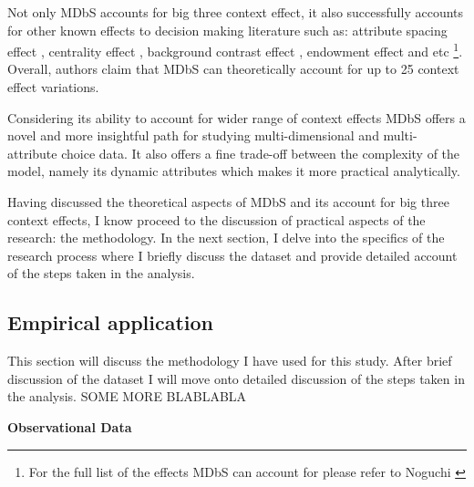 \documentclass[a4paper,12pt]{article}
\newcommand{\citeyearonly}[1]{\citeyearpar{#1}}
\begin{document}
Not only MDbS accounts for big three context effect, it also successfully accounts for other known effects to decision making literature such as: attribute spacing effect \citep{cooke1998multiattribute}, centrality effect \citep{brown2011decision}, background contrast effect \citep{tverskySimonson93}, endowment effect \citep{knetsch1989endowment} and etc \footnote{For the full list of the effects MDbS can account for please refer to Noguchi \citeyearonly{noguchi2018multialternative}}. Overall, authors claim that MDbS can theoretically account for up to 25 context effect variations. 

Considering its ability to account for wider range of context effects MDbS offers a novel and more insightful path for studying multi-dimensional and multi-attribute choice data. It also offers a fine trade-off between the complexity of the model, namely its dynamic attributes which makes it more practical analytically. 

Having discussed the theoretical aspects of MDbS and its account for big three context effects, I know proceed to the discussion of practical aspects of the research: the methodology. In the next section, I delve into the specifics of the research process where I briefly discuss the dataset and provide detailed account of the steps taken in the analysis.

\subsection{Empirical application}

This section will discuss the methodology I have used for this study. After brief discussion of the dataset I will move onto detailed discussion of the steps taken in the analysis. SOME MORE BLABLABLA

\textbf{Observational Data}\label{section:observationalDataDescription}
\end{document}
